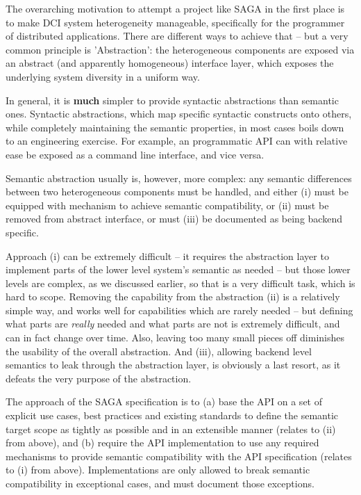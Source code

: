 \documentclass[a4paper,12pt]{article}
\newcommand{\I}[1]{\textit{#1}}
\newcommand{\B}[1]{\textbf{#1}}
\begin{document}
    The overarching motivation to attempt a project like SAGA in the
    first place is to make DCI system heterogeneity manageable,
    specifically for the programmer of distributed applications.
    There are different ways to achieve that -- but a very common
    principle is 'Abstraction': the heterogeneous components are
    exposed via an abstract (and apparently homogeneous) interface
    layer, which exposes the underlying system diversity in a uniform
    way.

    In general, it is \B{much} simpler to provide syntactic
    abstractions than semantic ones.  Syntactic abstractions, which
    map specific syntactic constructs onto others, while completely
    maintaining the semantic properties, in most cases boils down to
    an engineering exercise.  For example, an programmatic API can
    with relative ease be exposed as a command line interface, and
    vice versa.

    Semantic abstraction usually is, however, more complex: any
    semantic differences between two heterogeneous components must be
    handled, and either (i) must be equipped with mechanism to achieve
    semantic compatibility, or (ii) must be removed from abstract
    interface, or must (iii) be documented as being backend specific.

    Approach (i) can be extremely difficult -- it requires the
    abstraction layer to implement parts of the lower level system's
    semantic as needed -- but those lower levels are complex, as we
    discussed earlier, so that is a very difficult task, which is hard
    to scope.  Removing the capability from the abstraction (ii) is a
    relatively simple way, and works well for capabilities which are
    rarely needed -- but defining what parts are \I{really} needed and
    what parts are not is extremely difficult, and can in fact change
    over time.  Also, leaving too many small pieces off diminishes the
    usability of the overall abstraction.  And (iii), allowing backend
    level semantics to leak through the abstraction layer, is
    obviously a last resort, as it defeats the very purpose of the
    abstraction.

    The approach of the SAGA specification is to (a) base the API on a
    set of explicit use cases, best practices and existing standards
    to define the semantic target scope as tightly as possible and in
    an extensible manner (relates to (ii) from above), and (b) require
    the API implementation to use any required mechanisms to provide
    semantic compatibility with the API specification (relates to (i)
    from above).  Implementations are only allowed to break semantic
    compatibility in exceptional cases, and must document those
    exceptions.
\end{document}
